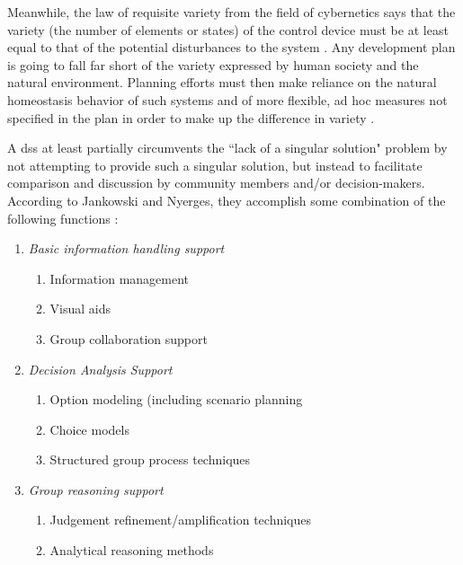 Meanwhile, the law of requisite variety from the field of cybernetics says that the variety (the number of elements or states) of the control device must be at least equal to that of the potential disturbances to the system \cite{ashbyRequisiteVarietyIts1991}. Any development plan is going to fall far short of the variety expressed by human society and the natural environment. Planning efforts must then make reliance on the natural homeostasis behavior of such systems and of more flexible, ad hoc measures not specified in the plan in order to make up the difference in variety \cite{mcloughlinSystemGuidanceControl1972}. 

A \ac{dss} at least partially circumvents the ``lack of a singular solution" problem by not attempting to provide such a singular solution, but instead to facilitate comparison and discussion by community members and/or decision-makers. According to Jankowski and Nyerges, they accomplish some combination of the following functions \cite{jankowskiGISGroupDecision2001}: 

\begin{enumerate}[itemsep=0pt,parsep=0pt]
	\item{\textit{Basic information handling support}}
		\begin{enumerate}[itemsep=0pt,parsep=0pt,topsep=0pt, partopsep=0pt]
			\item{Information management}
			\item{Visual aids}
			\item{Group collaboration support}
		\end{enumerate}
	\item{\textit{Decision Analysis Support}}
		\begin{enumerate}[itemsep=0pt,parsep=0pt,topsep=0pt, partopsep=0pt]
			\item{Option modeling (including scenario planning \cite{borjesonScenarioTypesTechniques2006}}
			\item{Choice models}
			\item{Structured group process techniques}
		\end{enumerate}
	\item{\textit{Group reasoning support}}
		\begin{enumerate}[itemsep=0pt,parsep=0pt,topsep=0pt, partopsep=0pt]
			\item{Judgement refinement/amplification techniques}
			\item{Analytical reasoning methods}
		\end{enumerate}
\end{enumerate}

